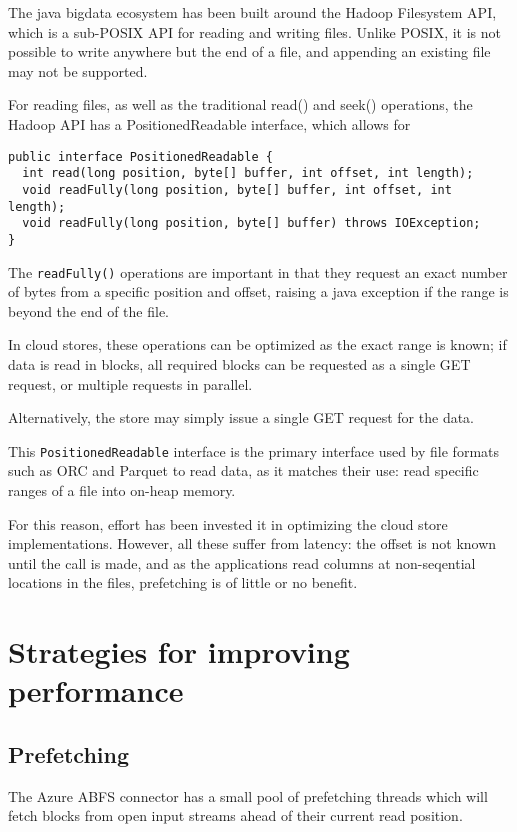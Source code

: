 \documentclass[manuscript]{acmart}
\begin{document}
The java bigdata ecosystem has been built around the Hadoop Filesystem API,
which is a sub-POSIX API for reading and writing files.
Unlike POSIX, it is not possible to write anywhere but the end of a file,
and appending an existing file may not be supported.

For reading files, as well as the traditional read() and seek() operations,
the Hadoop API has a PositionedReadable interface, which allows for

\begin{verbatim}
public interface PositionedReadable {
  int read(long position, byte[] buffer, int offset, int length);
  void readFully(long position, byte[] buffer, int offset, int length);
  void readFully(long position, byte[] buffer) throws IOException;
}
\end{verbatim}

The \texttt{readFully()} operations are important in that they
request an exact number of bytes from a specific position and offset,
raising a java exception if the range is beyond the end of the file.

In cloud stores, these operations can be optimized as the exact range is known;
if data is read in blocks, all required blocks can be requested as
a single GET request, or multiple requests in parallel.

Alternatively, the store may simply issue a single GET request for the data.

This \texttt{PositionedReadable} interface is the primary interface
used by file formats such as ORC and Parquet to read data, as it matches
their use: read specific ranges of a file into on-heap memory.

For this reason, effort has been invested it in optimizing the
cloud store implementations.
However, all these suffer from latency: the offset is not known until
the call is made, and as the applications read columns at non-seqential
locations in the files, prefetching is of little or no benefit.


\section{Strategies for improving performance}
\subsection{Prefetching}

The Azure ABFS connector has a small pool of prefetching threads
which will fetch blocks from open input streams ahead of
their current read position.
\end{document}

